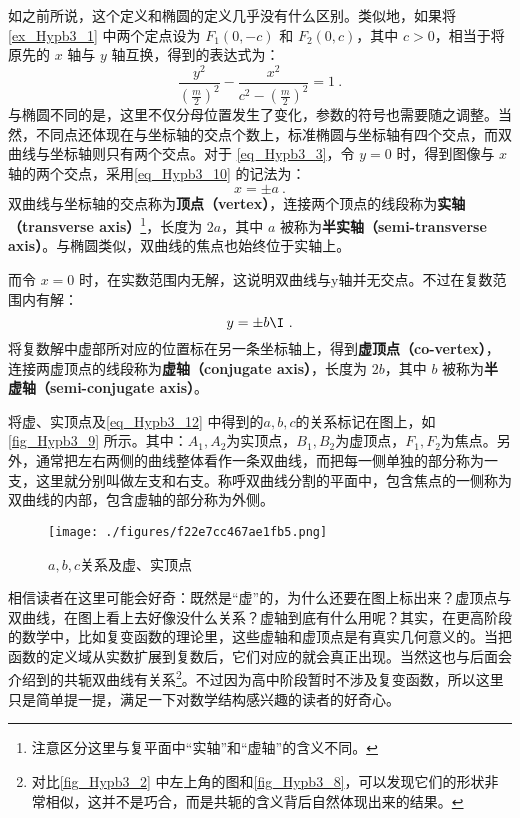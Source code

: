 如之前所说，这个定义和椭圆的定义几乎没有什么区别。类似地，如果将 \autoref{ex_Hypb3_1} 中两个定点设为 $F_1(0,-c)$ 和 $F_2(0,c)$，其中 $c>0$，相当于将原先的 $x$ 轴与 $y$ 轴互换，得到的表达式为：
\begin{equation}\label{eq_Hypb3_7}
\frac{y^2}{\left(\displaystyle\frac{m}{2}\right)^2}-\frac{x^2}{\displaystyle c^2-\left(\frac{m}{2}\right)^2} =1~.
\end{equation}
与椭圆不同的是，这里不仅分母位置发生了变化，参数的符号也需要随之调整。当然，不同点还体现在与坐标轴的交点个数上，标准椭圆与坐标轴有四个交点，而双曲线与坐标轴则只有两个交点。对于 \autoref{eq_Hypb3_3}，令 $y=0$ 时，得到图像与 $x$ 轴的两个交点，采用\autoref{eq_Hypb3_10} 的记法为：
\begin{equation}
x = \pm a~.
\end{equation}
双曲线与坐标轴的交点称为\textbf{顶点（vertex）}，连接两个顶点的线段称为\textbf{实轴（transverse axis）}\footnote{注意区分这里与复平面中“实轴”和“虚轴”的含义不同。}，长度为 $2a$，其中 $a$ 被称为\textbf{半实轴（semi-transverse axis）}。与椭圆类似，双曲线的焦点也始终位于实轴上。

而令 $x=0$ 时，在实数范围内无解，这说明双曲线与y轴并无交点。不过在复数范围内有解：
\begin{equation}
y = \pm  b\I~.
\end{equation}
将复数解中虚部所对应的位置标在另一条坐标轴上，得到\textbf{虚顶点（co-vertex）}，连接两虚顶点的线段称为\textbf{虚轴（conjugate axis）}，长度为 $2b$，其中 $b$ 被称为\textbf{半虚轴（semi-conjugate axis）}。

将虚、实顶点及\autoref{eq_Hypb3_12} 中得到的$a,b,c$的关系标记在图上，如\autoref{fig_Hypb3_9} 所示。其中：$A_1,A_2$为实顶点，$B_1,B_2$为虚顶点，$F_1,F_2$为焦点。另外，通常把左右两侧的曲线整体看作一条双曲线，而把每一侧单独的部分称为一支，这里就分别叫做左支和右支。称呼双曲线分割的平面中，包含焦点的一侧称为双曲线的内部，包含虚轴的部分称为外侧。
\begin{figure}[ht]
\centering
\texttt{[image: ./figures/f22e7cc467ae1fb5.png]}
\caption{$a,b,c$关系及虚、实顶点} \label{fig_Hypb3_9}
\end{figure}

相信读者在这里可能会好奇：既然是“虚”的，为什么还要在图上标出来？虚顶点与双曲线，在图上看上去好像没什么关系？虚轴到底有什么用呢？其实，在更高阶段的数学中，比如复变函数的理论里，这些虚轴和虚顶点是有真实几何意义的。当把函数的定义域从实数扩展到复数后，它们对应的就会真正出现。当然这也与后面会介绍到的共轭双曲线有关系\footnote{对比\autoref{fig_Hypb3_2} 中左上角的图和\autoref{fig_Hypb3_8}，可以发现它们的形状非常相似，这并不是巧合，而是共轭的含义背后自然体现出来的结果。}。不过因为高中阶段暂时不涉及复变函数，所以这里只是简单提一提，满足一下对数学结构感兴趣的读者的好奇心。

